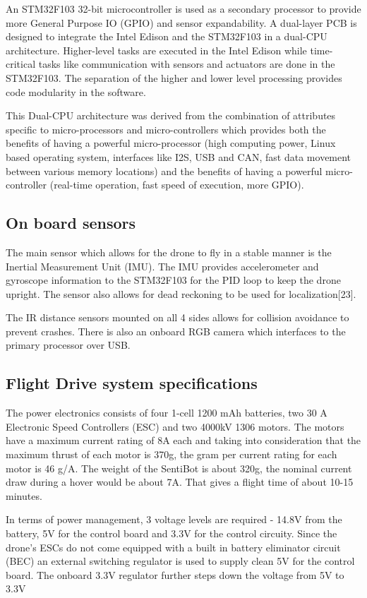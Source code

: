 \documentclass[12pt]{article}
\begin{document}
An STM32F103 32-bit microcontroller is used as a secondary processor to provide more General Purpose IO (GPIO) and sensor expandability. A dual-layer PCB is designed to integrate the Intel Edison and the STM32F103 in a dual-CPU architecture. Higher-level tasks are executed in the Intel Edison while time-critical tasks like communication with sensors and actuators are done in the STM32F103. The separation of the higher and lower level processing provides code modularity in the software.

This Dual-CPU architecture was derived from the combination of attributes specific to micro-processors and micro-controllers which provides both the benefits of having a powerful micro-processor (high computing power, Linux based operating system, interfaces like I2S, USB and CAN, fast data movement between various memory locations) and the benefits of having a powerful micro-controller (real-time operation, fast speed of execution, more GPIO). 

\subsection{On board sensors}

The main sensor which allows for the drone to fly in a stable manner is the Inertial Measurement Unit (IMU). The IMU provides accelerometer and gyroscope information to the STM32F103 for the PID loop to keep the drone upright. The sensor also allows for dead reckoning to be used for localization[23].

The IR distance sensors mounted on all 4 sides allows for collision avoidance to prevent crashes. There is also an onboard RGB camera which interfaces to the primary processor over USB. 

\subsection{Flight Drive system specifications}

The power electronics consists of four 1-cell 1200 mAh batteries, two 30 A Electronic Speed Controllers (ESC) and two 4000kV 1306 motors. The motors have a maximum current rating of 8A each and taking into consideration that the maximum thrust of each motor is 370g, the gram per current rating for each motor is 46 g/A. The weight of the SentiBot is about 320g, the nominal current draw during a hover would be about 7A. That gives a flight time of about 10-15 minutes. 

In terms of power management, 3 voltage levels are required - 14.8V from the battery, 5V for the control board and 3.3V for the control circuity. Since the drone’s ESCs do not come equipped with a built in battery eliminator circuit (BEC) an external switching regulator is used to supply clean 5V for the control board. The onboard 3.3V regulator further steps down the voltage from 5V to 3.3V
\end{document}
